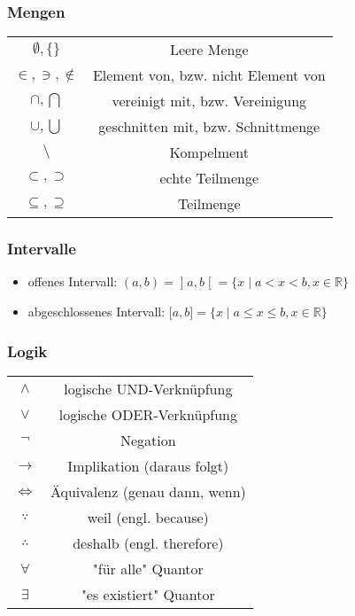 \documentclass{scrartcl} %
\begin{document}
\begin{multicols*}{3}
					\subsubsection{Mengen}
					    \begin{tabular}[h]{|c|c|}
					         $\emptyset, \{\}$ & Leere Menge \\
					         $\in,\ni, \not\in$ & Element von, bzw. nicht Element von \\
					         $\cap, \bigcap$ & vereinigt mit, bzw. Vereinigung \\
					         $\cup, \bigcup$ & geschnitten mit, bzw. Schnittmenge \\
					         $\setminus$ & Kompelment \\
					         $\subset, \supset$ & echte Teilmenge \\
					         $\subseteq, \supseteq$ & Teilmenge \\
					    \end{tabular}
					 \subsubsection{Intervalle}
    				    \begin{itemize}
    				        \item offenes Intervall: $(a,b) = \mathopen]a,b\mathclose[ = \{x \mid a < x < b, x \in \mathbb{R}\}$
    				        \item abgeschlossenes Intervall: $\mathopen[a,b\mathclose] = \{x \mid a \leq x \leq b, x \in \mathbb{R}\}$
    				    \end{itemize}
					\subsubsection{Logik}
					    \begin{tabular}[h]{|c|c|}
					        $\land$ & logische UND-Verknüpfung \\ %
					        $\lor$ & logische ODER-Verknüpfung \\ %
					        $\neg$ & Negation \\
					        $\longrightarrow$ & Implikation (daraus folgt)\\
				            $\iff$ & Äquivalenz (genau dann, wenn) \\
				            $\because$ &  weil (engl. because) \\
				            $\therefore$  & deshalb (engl. therefore) \\
				            $\forall$ & "für alle" Quantor \\
				            $\exists$ & "es existiert" Quantor \\
					    \end{tabular}      

\end{multicols*}
\end{document}
